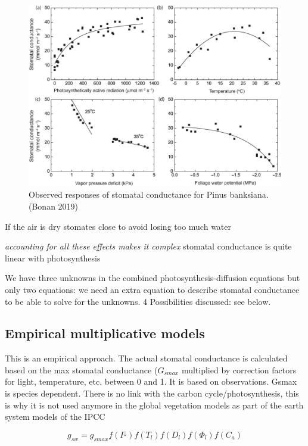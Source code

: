 \documentclass[
  12pt,
  oneside]{book}
\begin{document}
\begin{figure}

{\centering \includegraphics[width=0.8\linewidth]{figures/chap2/gs_obs} 

}

\caption{Observed responses of stomatal conductance for Pinus banksiana. (Bonan 2019)}\label{fig:f212}
\end{figure}

If the air is dry stomates close to avoid losing too much water

\emph{accounting for all these effects makes it complex
}stomatal conductance is quite linear with photosynthesis

We have three unknowns in the combined photosynthesis-diffusion equations but only two equations: we need an extra equation to describe stomatal conductance to be able to solve for the unknowns. 4 Possibilities discussed: see below.

\hypertarget{empirical-multiplicative-models}{%
\subsection{Empirical multiplicative models}\label{empirical-multiplicative-models}}

This is an empirical approach. The actual stomatal conductance is calculated based on the max stomatal conductance (\(G_{smax}\) multiplied by correction factors for light, temperature, etc. between 0 and 1. It is based on observations. Gsmax is species dependent.
There is no link with the carbon cycle/photosynthesis, this is why it is not used anymore in the global vegetation models as part of the earth system models of the IPCC

\[
g_{sw}=g_{smax}f(I^{\downarrow})f(T_l)f(D_l)f(\Phi_l)f(C_a)
\]
\end{document}
